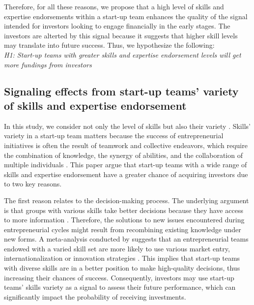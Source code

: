 \documentclass[12pt]{article}
\begin{document}
Therefore, for all these reasons, we propose that a high level of skills and expertise endorsements within a start-up team enhances the quality of the signal intended for investors looking to engage financially in the early stages. The investors are alterted by this signal because it suggests that higher skill levels may translate into future success. Thus, we hypothesize the following: \\

\noindent \textit{H1: Start-up teams with greater skills and expertise endorsement levels will get more fundings from investors}

\subsection{Signaling effects from start-up teams' variety of skills and expertise endorsement}

In this study, we consider not only the level of skills but also their variety \citep{harrison2007s}. Skills' variety in a start-up team matters because the success of entrepreneurial initiatives is often the result of teamwork and collective endeavors, which require the combination of knowledge, the synergy of abilities, and the collaboration of multiple individuals \citep{klotz2014new}. This paper argue that start-up teams with a wide range of skills and expertise endorsement have a greater chance of acquiring investors due to two key reasons.

The first reason relates to the decision-making process. The underlying argument is that groups with various skills take better decisions because they have access to more information \citep{hong2001problem}. Therefore, the solutions to new issues encountered during entrepreneurial cycles might result from recombining existing knowledge under new forms. A meta-analysis conducted by \citet{jin2017entrepreneurial} suggests that an entrepreneurial teams endowed with a varied skill set are more likely to use various market entry, internationalization or innovation strategies \citep{boeker1989strategic}. This implies that start-up teams with diverse skills are in a better position to make high-quality decisions, thus increasing their chances of success. Consequently, investors may use start-up teams' skills variety as a signal to assess their future performance, which can significantly impact the probability of receiving investments.
\end{document}
